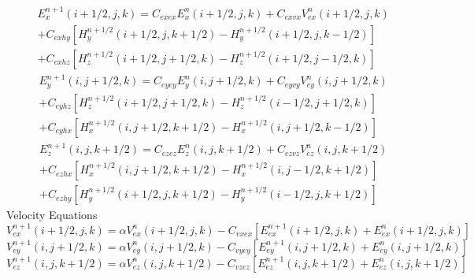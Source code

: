 \documentclass[a4paper,10pt]{article}
\begin{document}
\begin{eqnarray}
&& E_{x}^{n+1}(i+1/2,j,k)=C_{exex} E_{x}^{n}(i+1/2,j,k)+C_{exvx} V_{ex}^{n}(i+1/2,j,k)\nonumber\\
&& +C_{exhy}\left[H_{y}^{n+1/2}(i+1/2,j,k+1/2)-H_{y}^{n+1/2}(i+1/2,j,k-1/2)\right]\nonumber\\
&& +C_{exhz}\left[H_{z}^{n+1/2}(i+1/2,j+1/2,k)-H_{z}^{n+1/2}(i+1/2,j-1/2,k)\right]
\end{eqnarray}
\begin{eqnarray}
&& E_{y}^{n+1}(i,j+1/2,k)=C_{eyey} E_{y}^{n}(i,j+1/2,k)+C_{eyvy} V_{ey}^{n}(i,j+1/2,k)\nonumber\\
&& +C_{eyhz}\left[H_{z}^{n+1/2}(i+1/2,j+1/2,k)-H_{z}^{n+1/2}(i-1/2,j+1/2,k)\right]\nonumber\\
&& +C_{eyhx}\left[H_{x}^{n+1/2}(i,j+1/2,k+1/2)-H_{x}^{n+1/2}(i,j+1/2,k-1/2)\right]
\end{eqnarray}
\begin{eqnarray}
&& E_{z}^{n+1}(i,j,k+1/2)=C_{ezez} E_{z}^{n}(i,j,k+1/2)+C_{ezvz} V_{ez}^{n}(i,j,k+1/2)\nonumber\\
&& +C_{ezhx}\left[H_{x}^{n+1/2}(i,j+1/2,k+1/2)-H_{x}^{n+1/2}(i,j-1/2,k+1/2)\right]\nonumber\\
&& +C_{ezhy}\left[H_{y}^{n+1/2}(i+1/2,j,k+1/2)-H_{y}^{n+1/2}(i-1/2,j,k+1/2)\right]
\end{eqnarray}
Velocity Equations
\begin{equation}
V_{ex}^{n+1}(i+1/2,j,k)=\alpha V_{ex}^{n}(i+1/2,j,k)-C_{vxex}\left[E_{ex}^{n+1}(i+1/2,j,k)+E_{ex}^{n}(i+1/2,j,k)\right]
\end{equation}
\begin{equation}
V_{ey}^{n+1}(i,j+1/2,k)=\alpha V_{ey}^{n}(i,j+1/2,k)-C_{vyey}\left[E_{ey}^{n+1}(i,j+1/2,k)+E_{ey}^{n}(i,j+1/2,k)\right]
\end{equation}
\begin{equation}
V_{ez}^{n+1}(i,j,k+1/2)=\alpha V_{ez}^{n}(i,j,k+1/2)-C_{vzez}\left[E_{ez}^{n+1}(i,j,k+1/2)+E_{ez}^{n}(i,j,k+1/2)\right]
\end{equation}
\end{document}
